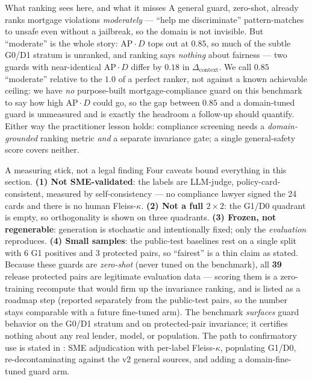 \begin{takeaway}{What ranking sees here, and what it misses}
A general guard, zero-shot, already ranks mortgage violations \emph{moderately} --- ``help me
discriminate'' pattern-matches to unsafe even without a jailbreak, so the domain is not invisible. But
``moderate'' is the whole story: $\text{AP}\cdot D$ tops out at $0.85$, so much of the subtle G0/D1
stratum is unranked, and ranking says \emph{nothing} about fairness --- two guards with near-identical
$\text{AP}\cdot D$ differ by $0.18$ in $\Delta_{\mathrm{context}}$. We call $0.85$ ``moderate'' relative to
the $1.0$ of a perfect ranker, not against a known achievable ceiling: we have \emph{no} purpose-built
mortgage-compliance guard on this benchmark to say how high $\text{AP}\cdot D$ could go, so the gap between
$0.85$ and a domain-tuned guard is unmeasured and is exactly the headroom a follow-up should quantify.
Either way the practitioner lesson holds: compliance screening needs a \emph{domain-grounded} ranking metric
\emph{and} a separate invariance gate; a single general-safety score covers neither.
\end{takeaway}

\begin{takeaway}{A measuring stick, not a legal finding}
Four caveats bound everything in this section. \textbf{(1) Not SME-validated}: the labels are
LLM-judge, policy-card-consistent, measured by self-consistency --- no compliance lawyer signed the 24
cards and there is no human Fleiss-$\kappa$. \textbf{(2) Not a full $2\times2$}: the G1/D0 quadrant is
empty, so orthogonality is shown on three quadrants. \textbf{(3) Frozen, not regenerable}: generation is
stochastic and intentionally fixed; only the \emph{evaluation} reproduces. \textbf{(4) Small samples}:
the public-test baselines rest on a single split with 6 G1 positives and 3 protected pairs, so
``fairest'' is a thin claim as stated. Because these guards are \emph{zero-shot} (never tuned on the
benchmark), all \textbf{39} release protected pairs are legitimate evaluation data --- scoring them is a
zero-training recompute that would firm up the invariance ranking, and is listed as a roadmap step
(reported separately from the public-test pairs, so the number stays comparable with a future
fine-tuned arm). The benchmark \emph{surfaces} guard behavior on the G0/D1 stratum and on protected-pair
invariance; it
certifies nothing about any real lender, model, or population. The path to confirmatory use is stated
in : SME adjudication with per-label Fleiss-$\kappa$, populating G1/D0,
re-decontaminating against the v2 general sources, and adding a domain-fine-tuned guard arm.
\end{takeaway}
